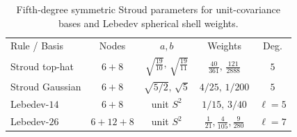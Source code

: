 \begin{table}[ht]
\caption{\label{tab:stroud14}%
Fifth-degree symmetric Stroud parameters for unit-covariance bases and Lebedev spherical shell weights.}
\scriptsize
\setlength{\tabcolsep}{3.0pt}
\begin{ruledtabular}
\begin{tabular}{lcccc}
Rule / Basis & Nodes & $a, b$ & Weights & Deg. \\
\colrule
Stroud top-hat & $6{+}8$ & $\sqrt{\frac{19}{10}},\,\sqrt{\frac{19}{11}}$ & $\frac{40}{361},\,\frac{121}{2888}$ & $5$ \\
Stroud Gaussian & $6{+}8$ & $\sqrt{5/2},\,\sqrt{5}$ & $4/25,\,1/200$ & $5$ \\
Lebedev-$14$ & $6{+}8$ & unit $S^2$ & $1/15,\,3/40$ & $\ell=5$ \\
Lebedev-$26$ & $6{+}12{+}8$ & unit $S^2$ & $\frac{1}{21},\frac{4}{105},\frac{9}{280}$ & $\ell=7$ \\
\end{tabular}
\end{ruledtabular}
\end{table}
